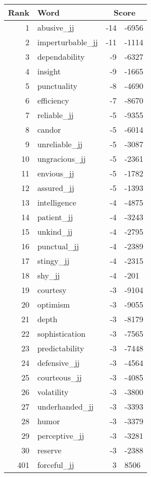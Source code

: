 \begin{longtable}[!htbp]{| rlr@{.}l |}
    \hline
    \textbf{Rank} & \textbf{Word} & \multicolumn{2}{c|}{\textbf{Score}} \\
    \hline
    \endhead
    1 & abusive\_jj & -14 & -6956 \\
    2 & imperturbable\_jj & -11 & -1114 \\
    3 & dependability & -9 & -6327 \\
    4 & insight & -9 & -1665 \\
    5 & punctuality & -8 & -4690 \\
    6 & efficiency & -7 & -8670 \\
    7 & reliable\_jj & -5 & -9355 \\
    8 & candor & -5 & -6014 \\
    9 & unreliable\_jj & -5 & -3087 \\
    10 & ungracious\_jj & -5 & -2361 \\
    11 & envious\_jj & -5 & -1782 \\
    12 & assured\_jj & -5 & -1393 \\
    13 & intelligence & -4 & -4875 \\
    14 & patient\_jj & -4 & -3243 \\
    15 & unkind\_jj & -4 & -2795 \\
    16 & punctual\_jj & -4 & -2389 \\
    17 & stingy\_jj & -4 & -2315 \\
    18 & shy\_jj & -4 & -201 \\
    19 & courtesy & -3 & -9104 \\
    20 & optimism & -3 & -9055 \\
    21 & depth & -3 & -8179 \\
    22 & sophistication & -3 & -7565 \\
    23 & predictability & -3 & -7448 \\
    24 & defensive\_jj & -3 & -4564 \\
    25 & courteous\_jj & -3 & -4085 \\
    26 & volatility & -3 & -3800 \\
    27 & underhanded\_jj & -3 & -3393 \\
    28 & humor & -3 & -3379 \\
    29 & perceptive\_jj & -3 & -3281 \\
    30 & reserve & -3 & -2388 \\
    401 & forceful\_jj & 3 & 8506 \\

\end{longtable}
